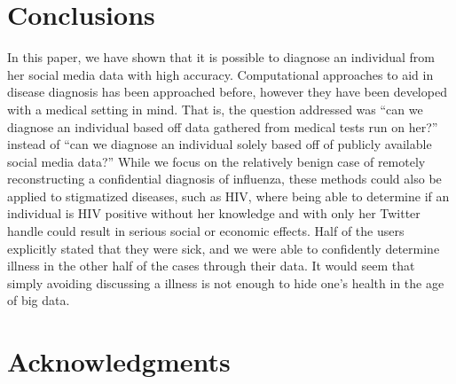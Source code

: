 \documentclass{acm_proc_article-sp}
\begin{document}
\section{Conclusions}


In this paper, we have shown that it is possible to diagnose an individual from her social media data with high accuracy. Computational approaches to aid in disease diagnosis has been approached before, however they have been developed with a medical setting in mind. That is, the question addressed was ``can we diagnose an individual based off data gathered from medical tests run on her?'' instead of ``can we diagnose an individual solely based off of publicly available social media data?''  While we focus on the relatively benign case of remotely reconstructing a confidential diagnosis of influenza, these methods could also be applied to stigmatized diseases, such as HIV, where being able to determine if an individual is HIV positive without her knowledge and with only her Twitter handle could result in serious social or economic effects. Half of the users explicitly stated that they were sick, and we were able to confidently determine illness in the other half of the cases through their data. It would seem that simply avoiding discussing a illness is not enough to hide one's health in the age of big data. 


\section{Acknowledgments}
\end{document}
